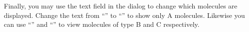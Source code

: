 Finally, you may use the  text field in the  dialog to change which molecules are displayed. Change the text from ``'' to ``'' to show only A molecules. Likewise you can use ``'' and ``'' to view molecules of type B and C respectively.


